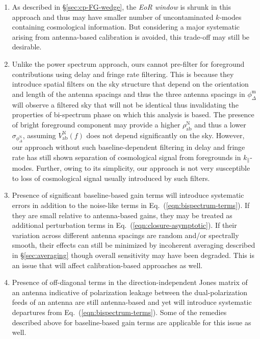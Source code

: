 \documentclass[
reprint,
superscriptaddress,
amsmath,
amssymb,
aps,
prd
]{revtex4-1}
\begin{document}
\begin{enumerate}
\item As described in \S\ref{sec:cp-FG-wedge}, the {\it EoR window} is shrunk in this approach and thus may have smaller number of uncontaminated $k$-modes containing cosmological information. But considering a major systematic arising from antenna-based calibration is avoided, this trade-off may still be desirable.
\item Unlike the power spectrum approach, ours cannot pre-filter for foreground contributions using delay and fringe rate filtering. This is because they introduce spatial filters on the sky structure that depend on the orientation and length of the antenna spacings and thus the three antenna spacings in $\phi_\Delta^\textrm{m}$ will observe a filtered sky that will not be identical thus invalidating the properties of bi-spectrum phase on which this analysis is based. The presence of bright foreground component may provide a higher $\rho_\textrm{ab}^\textrm{N}$ and thus a lower $\sigma_{\phi_\Delta^\textrm{N}}$, assuming $V_\textrm{ab}^\textrm{N}(f)$ does not depend significantly on the sky. However, our approach without such baseline-dependent filtering in delay and fringe rate has still shown separation of cosmological signal from foregrounds in $k_\parallel$-modes. Further, owing to its simplicity, our approach is not very susceptible to loss of cosmological signal usually introduced by such filters.
\item Presence of significant baseline-based gain terms will introduce systematic errors in addition to the noise-like terms in Eq.~(\ref{eqn:bispectrum-terms}). If they are small relative to antenna-based gains, they may be treated as additional perturbation terms in Eq.~(\ref{eqn:closure-asymptotic}). If their variation across different antenna spacings are random and/or spectrally smooth, their effects can still be minimized by incoherent averaging described in \S\ref{sec:averaging} though overall sensitivity may have been degraded. This is an issue that will affect calibration-based approaches as well. %
\item Presence of off-diagonal terms in the direction-independent Jones matrix of an antenna indicative of polarization leakage between the dual-polarization feeds of an antenna are still antenna-based and yet will introduce systematic departures from Eq.~(\ref{eqn:bispectrum-terms}). Some of the remedies described above for baseline-based gain terms are applicable for this issue as well. %

\end{enumerate}
\end{document}
